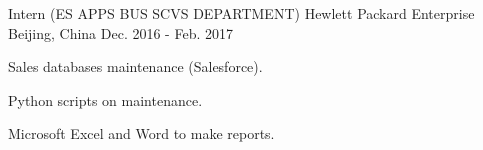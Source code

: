 \begin{cventries}
  \cventry
    {Intern (ES APPS BUS SCVS DEPARTMENT)} %
    {Hewlett Packard Enterprise} %
    {Beijing, China} %
    {Dec. 2016 - Feb. 2017} %
    {
      \begin{cvitems} %
        \item {Sales databases maintenance (Salesforce).}
        \item {Python scripts on maintenance.}
        \item {Microsoft Excel and Word to make reports.}
      \end{cvitems}
    }

  
\end{cventries}
